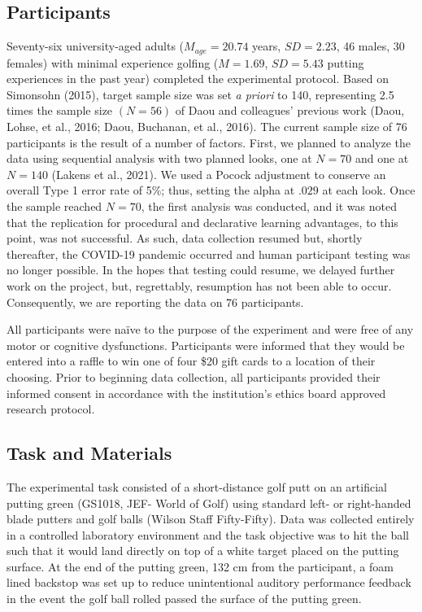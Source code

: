 \documentclass[
  english,
  man,floatsintext]{apa7}
\begin{document}
\hypertarget{participants}{%
\subsection{Participants}\label{participants}}

Seventy-six university-aged adults (\(M_{age}= 20.74\) years, \(SD = 2.23\), 46 males, 30 females) with minimal experience golfing (\(M = 1.69\), \(SD = 5.43\) putting experiences in the past year) completed the experimental protocol. Based on Simonsohn (2015), target sample size was set \emph{a priori} to 140, representing 2.5 times the sample size \((N = 56)\) of Daou and colleagues' previous work (Daou, Lohse, et al., 2016; Daou, Buchanan, et al., 2016). The current sample size of 76 participants is the result of a number of factors. First, we planned to analyze the data using sequential analysis with two planned looks, one at \(N = 70\) and one at \(N = 140\) (Lakens et al., 2021). We used a Pocock adjustment to conserve an overall Type 1 error rate of 5\%; thus, setting the alpha at \(.029\) at each look. Once the sample reached \(N = 70\), the first analysis was conducted, and it was noted that the replication for procedural and declarative learning advantages, to this point, was not successful. As such, data collection resumed but, shortly thereafter, the COVID-19 pandemic occurred and human participant testing was no longer possible. In the hopes that testing could resume, we delayed further work on the project, but, regrettably, resumption has not been able to occur. Consequently, we are reporting the data on 76 participants.

All participants were naïve to the purpose of the experiment and were free of any motor or cognitive dysfunctions. Participants were informed that they would be entered into a raffle to win one of four \$20 gift cards to a location of their choosing. Prior to beginning data collection, all participants provided their informed consent in accordance with the institution's ethics board approved research protocol.

\hypertarget{task-and-materials}{%
\subsection{Task and Materials}\label{task-and-materials}}

The experimental task consisted of a short-distance golf putt on an artificial putting green (GS1018, JEF- World of Golf) using standard left- or right-handed blade putters and golf balls (Wilson Staff Fifty-Fifty). Data was collected entirely in a controlled laboratory environment and the task objective was to hit the ball such that it would land directly on top of a white target placed on the putting surface. At the end of the putting green, 132 cm from the participant, a foam lined backstop was set up to reduce unintentional auditory performance feedback in the event the golf ball rolled passed the surface of the putting green.
\end{document}
